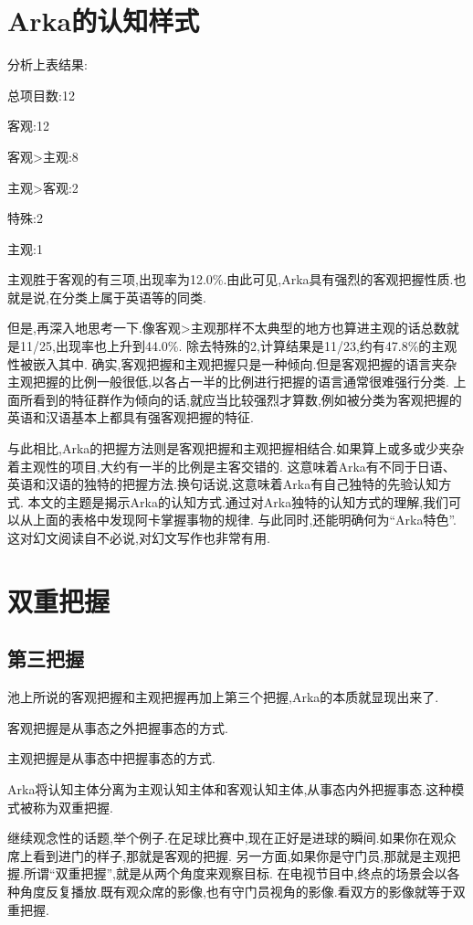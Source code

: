 \section{Arka的认知样式}

分析上表结果:

总项目数:12

客观:12

客观>主观:8

主观>客观:2

特殊:2

主观:1

主观胜于客观的有三项,出现率为12.0\%.由此可见,Arka具有强烈的客观把握性质.也就是说,在分类上属于英语等的同类.

但是,再深入地思考一下.像客观>主观那样不太典型的地方也算进主观的话总数就是11/25,出现率也上升到44.0\%.
除去特殊的2,计算结果是11/23,约有47.8\%的主观性被嵌入其中.
确实,客观把握和主观把握只是一种倾向.但是客观把握的语言夹杂主观把握的比例一般很低,以各占一半的比例进行把握的语言通常很难强行分类.
上面所看到的特征群作为倾向的话,就应当比较强烈才算数,例如被分类为客观把握的英语和汉语基本上都具有强客观把握的特征.

与此相比,Arka的把握方法则是客观把握和主观把握相结合.如果算上或多或少夹杂着主观性的项目,大约有一半的比例是主客交错的.
这意味着Arka有不同于日语、英语和汉语的独特的把握方法.换句话说,这意味着Arka有自己独特的先验认知方式.
本文的主题是揭示Arka的认知方式.通过对Arka独特的认知方式的理解,我们可以从上面的表格中发现阿卡掌握事物的规律.
与此同时,还能明确何为``Arka特色''.这对幻文阅读自不必说,对幻文写作也非常有用.


\section{双重把握}
\subsection{第三把握}
池上所说的客观把握和主观把握再加上第三个把握,Arka的本质就显现出来了.

客观把握是从事态之外把握事态的方式.

主观把握是从事态中把握事态的方式.

Arka将认知主体分离为主观认知主体和客观认知主体,从事态内外把握事态.这种模式被称为双重把握.

继续观念性的话题,举个例子.在足球比赛中,现在正好是进球的瞬间.如果你在观众席上看到进门的样子,那就是客观的把握.
另一方面,如果你是守门员,那就是主观把握.所谓``双重把握'',就是从两个角度来观察目标.
在电视节目中,终点的场景会以各种角度反复播放.既有观众席的影像,也有守门员视角的影像.看双方的影像就等于双重把握.

